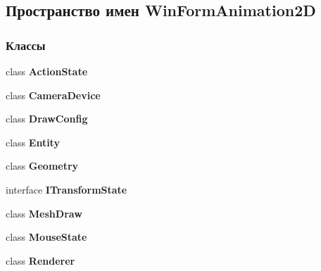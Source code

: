 \subsection{Пространство имен Win\+Form\+Animation2D}
\label{namespace_win_form_animation2_d}
\subsubsection*{Классы}
\begin{DoxyCompactItemize}
\item 
class {\bf Action\+State}
\item 
class {\bf Camera\+Device}
\item 
class {\bf Draw\+Config}
\item 
class {\bf Entity}
\item 
class {\bf Geometry}
\item 
interface {\bf I\+Transform\+State}
\item 
class {\bf Mesh\+Draw}
\item 
class {\bf Mouse\+State}
\item 
class {\bf Renderer}
\end{DoxyCompactItemize}
